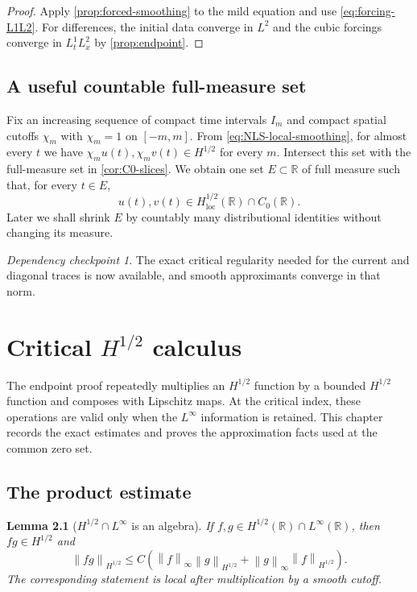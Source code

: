 \documentclass[11pt,oneside]{book}
\newtheorem{lemma}[theorem]{Lemma}
\theoremstyle{definition}
\theoremstyle{remark}
\newtheorem{checkpoint}[theorem]{Dependency checkpoint}
\newcommand{\R}{\mathbb R}
\newcommand{\1}{\mathbf 1}
\newcommand{\loc}{\mathrm{loc}}
\newcommand{\norm}[1]{\left\lVert #1\right\rVert}
\begin{document}
\begin{proof}
Apply \cref{prop:forced-smoothing} to the mild equation and use
\eqref{eq:forcing-L1L2}.  For differences, the initial data converge in
$L^2$ and the cubic forcings converge in $L^1_tL^2_x$ by
\cref{prop:endpoint}.
\end{proof}

\section{A useful countable full-measure set}
Fix an increasing sequence of compact time intervals $I_m$ and compact
spatial cutoffs $\chi_m$ with $\chi_m=1$ on $[-m,m]$.  From
\eqref{eq:NLS-local-smoothing}, for almost every $t$ we have
$\chi_m u(t),\chi_m v(t)\in H^{1/2}$ for every $m$.  Intersect this set with
the full-measure set in \cref{cor:C0-slices}.  We obtain one set
$E\subset\R$ of full measure such that, for every $t\in E$,
\begin{equation}
 u(t),v(t)\in H^{1/2}_{\loc}(\R)\cap C_0(\R).       \label{eq:good-slices}
\end{equation}
Later we shall shrink $E$ by countably many distributional identities without
changing its measure.

\begin{checkpoint}
The exact critical regularity needed for the current and diagonal traces is
now available, and smooth approximants converge in that norm.
\end{checkpoint}

\chapter{Critical \texorpdfstring{$H^{1/2}$}{H1/2} calculus}\label{chap:critical-calculus}

The endpoint proof repeatedly multiplies an $H^{1/2}$ function by a bounded
$H^{1/2}$ function and composes with Lipschitz maps.  At the critical index,
these operations are valid only when the $L^\infty$ information is retained.
This chapter records the exact estimates and proves the approximation facts
used at the common zero set.

\section{The product estimate}

\begin{lemma}[$H^{1/2}\cap L^\infty$ is an algebra]\label{lem:Hhalf-algebra}
If $f,g\in H^{1/2}(\R)\cap L^\infty(\R)$, then $fg\in H^{1/2}$ and
\begin{equation}
 \norm{fg}_{H^{1/2}}
 \le C\left(\norm f_\infty\norm g_{H^{1/2}}
           +\norm g_\infty\norm f_{H^{1/2}}\right). \label{eq:Hhalf-product}
\end{equation}
The corresponding statement is local after multiplication by a smooth
cutoff.
\end{lemma}
\end{document}
